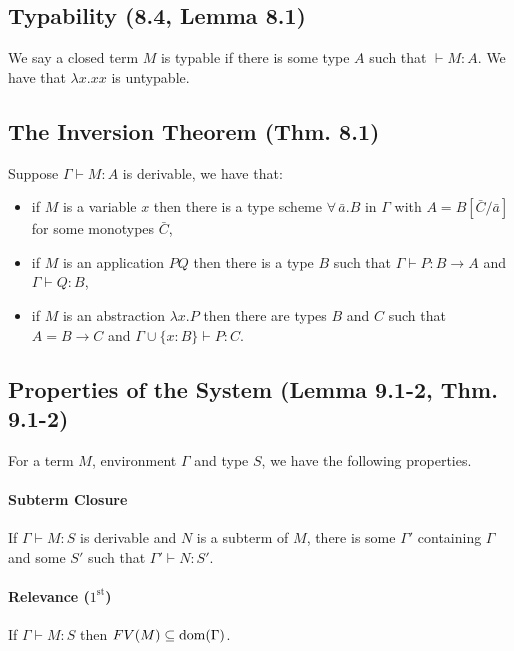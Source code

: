 \subsection{Typability (8.4, Lemma 8.1)}

We say a closed term $M$ is typable if there is some type $A$ such that
$\vdash M : A$. We have that $\lambda x.xx$ is untypable.

\subsection{The Inversion Theorem (Thm. 8.1)}

Suppose $\Gamma \vdash M : A$ is derivable, we have that: \begin{itemize}
    \item if $M$ is a variable $x$ then there is a type scheme
        $\forall \, \bar{a}.B$ in $\Gamma$ with $A = B[\bar{C}/\bar{a}]$ 
        for some monotypes $\bar{C}$,
    \item if $M$ is an application $PQ$ then there is a type $B$ such
        that $\Gamma \vdash P : B \to A$ and $\Gamma \vdash Q : B$,
    \item if $M$ is an abstraction $\lambda x.P$ then there are types
        $B$ and $C$ such that $A = B \to C$ and 
        $\Gamma \cup \{x : B\} \vdash P : C$.
\end{itemize}

\subsection{Properties of the System (Lemma 9.1-2, Thm. 9.1-2)}

For a term $M$, environment $\Gamma$ and type $S$, we
have the following properties.

\paragraph{Subterm Closure}
\leavevmode\newline
If $\Gamma \vdash M : S$ is derivable and $N$ is a subterm
of $M$, there is some $\Gamma'$ containing $\Gamma$ and
some $S'$ such that $\Gamma' \vdash N : S'$. 

\paragraph{Relevance ($1^{\text{st}}$)}
\leavevmode\newline
If $\Gamma \vdash M : S$ then $FV(M) \subseteq \operatorname{dom}(\Gamma)$.

